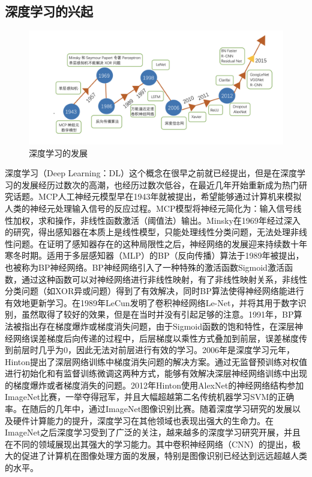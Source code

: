 \subsection{深度学习的兴起}
\begin{figure}[!htp]
  \centering
  \includegraphics[scale=0.5]{static/develop.png}
  \caption{深度学习的发展}
\end{figure}
深度学习（Deep Learning：DL）这个概念在很早之前就已经提出，但是在深度学习的发展经历过数次的高潮，也经历过数次低谷，在最近几年开始重新成为热门研究话题。MCP人工神经元模型早在1943年就被提出，希望能够通过计算机来模拟人类的神经元处理输入信号的反应过程。MCP模型将神经元简化为：输入信号线性加权，求和操作，非线性函数激活（阈值法）输出。Minsky在1969年经过深入的研究，得出感知器在本质上是线性模型，只能处理线性分类问题，无法处理非线性问题\cite{Rosenblatt1958The}。在证明了感知器存在的这种局限性之后，神经网络的发展迎来持续数十年寒冬时期。适用于多层感知器（MLP）的BP（反向传播）算法\cite{rumelhart1988learning}于1989年被提出，也被称为BP神经网络。BP神经网络引入了一种特殊的激活函数Sigmoid激活函数，通过这种函数可以对神经网络进行非线性映射，有了非线性映射关系，非线性分类问题（如XOR异或问题）得到了有效解决，同时BP算法使得神经网络能进行有效地更新学习。在1989年LeCun发明了卷积神经网络Le-Net\cite{lecun1998gradient}，并将其用于数字识别，虽然取得了较好的效果，但是在当时并没有引起足够的注意。1991年，BP算法被指出存在梯度爆炸或梯度消失问题，由于Sigmoid函数的饱和特性，在深层神经网络误差梯度后向传递的过程中，后层梯度以乘性方式叠加到前层，误差梯度传到前层时几乎为0，因此无法对前层进行有效的学习。2006年是深度学习元年，Hinton提出了深层网络训练中梯度消失问题的解决方案。通过无监督预训练对权值进行初始化和有监督训练微调\cite{hinton2006fast}这两种方式，能够有效解决深层神经网络训练中出现的梯度爆炸或者梯度消失的问题。2012年Hinton使用AlexNet\cite{krizhevsky2012imagenet}的神经网络结构参加ImageNet比赛，一举夺得冠军，并且大幅超越第二名传统机器学习SVM的正确率。在随后的几年中，通过ImageNet图像识别比赛。随着深度学习研究的发展以及硬件计算能力的提升，深度学习在其他领域也表现出强大的生命力。在ImageNet之后深度学习受到了广泛的关注，越来越多的深度学习研究开展，并且在不同的领域展现出其强大的学习能力。其中卷积神经网络（CNN）的提出，极大的促进了计算机在图像处理方面的发展，特别是图像识别已经达到远远超越人类的水平。
